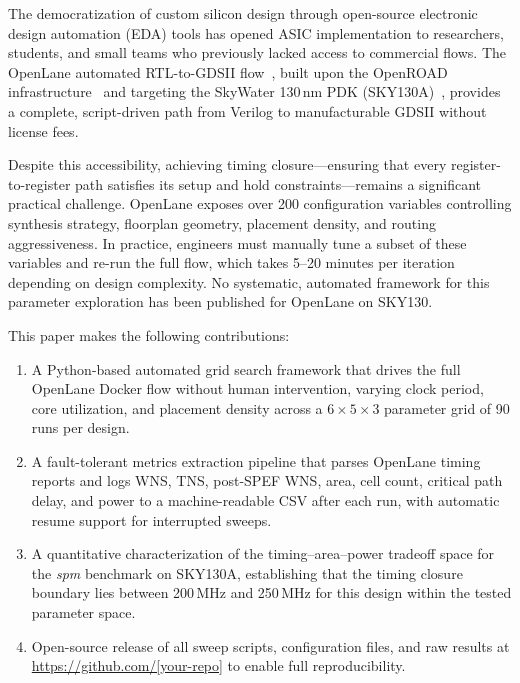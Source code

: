 \documentclass[conference]{IEEEtran}
\begin{document}
The democratization of custom silicon design through open-source
electronic design automation (EDA) tools has opened ASIC
implementation to researchers, students, and small teams who
previously lacked access to commercial flows. The OpenLane automated
RTL-to-GDSII flow~\cite{shalan2020}, built upon the OpenROAD
infrastructure~\cite{ajayi2019} and targeting the SkyWater 130\,nm
PDK (SKY130A)~\cite{sky130pdk}, provides a complete, script-driven
path from Verilog to manufacturable GDSII without license fees.

Despite this accessibility, achieving timing closure---ensuring that
every register-to-register path satisfies its setup and hold
constraints---remains a significant practical challenge. OpenLane
exposes over 200 configuration variables controlling synthesis
strategy, floorplan geometry, placement density, and routing
aggressiveness. In practice, engineers must manually tune a subset of
these variables and re-run the full flow, which takes 5--20 minutes
per iteration depending on design complexity. No systematic, automated
framework for this parameter exploration has been published for
OpenLane on SKY130.

This paper makes the following contributions:
\begin{enumerate}
  \item A Python-based automated grid search framework that drives the
    full OpenLane Docker flow without human intervention, varying clock
    period, core utilization, and placement density across a
    $6\!\times\!5\!\times\!3$ parameter grid of 90 runs per design.
  \item A fault-tolerant metrics extraction pipeline that parses
    OpenLane timing reports and logs WNS, TNS, post-SPEF WNS, area,
    cell count, critical path delay, and power to a machine-readable
    CSV after each run, with automatic resume support for interrupted
    sweeps.
  \item A quantitative characterization of the timing--area--power
    tradeoff space for the \textit{spm} benchmark on SKY130A,
    establishing that the timing closure boundary lies between 200\,MHz
    and 250\,MHz for this design within the tested parameter space.
  \item Open-source release of all sweep scripts, configuration files,
    and raw results at \url{https://github.com/[your-repo]} to enable
    full reproducibility.
\end{enumerate}

\end{document}
